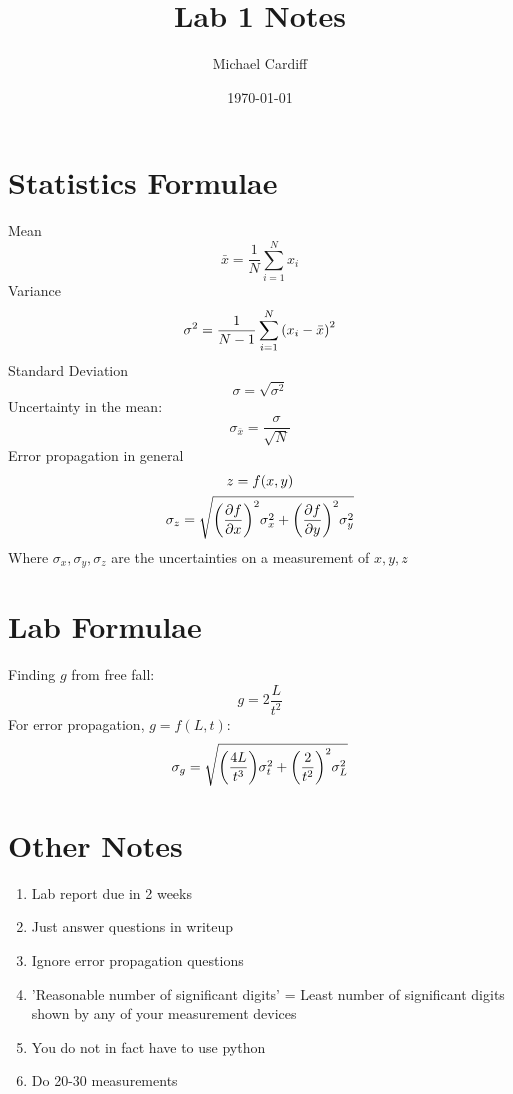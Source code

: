 \documentclass[12pt]{article}
\title{\vspace{-3em}Lab 1 Notes}
\author{Michael Cardiff}
\date{\today}
\begin{document}
\maketitle
\section{Statistics Formulae}
Mean
\begin{equation}
  \bar{x}=\frac{1}{N}\sum_{i=1}^Nx_i
\end{equation}
Variance
\begin{equation}
  \sigma^2=\frac{1}{N-1}\sum_{i=1}^N\qty(x_i-\bar{x})^2
\end{equation}
Standard Deviation
\begin{equation}
  \sigma=\sqrt{\sigma^2}
\end{equation}
Uncertainty in the mean:
\begin{equation}
  \sigma_{\bar{x}}=\frac{\sigma}{\sqrt{N}}
\end{equation}
Error propagation in general
\begin{gather*}
  z=f(x,y)\\
  \sigma_z=\sqrt{\qty(\pdv{f}{x})^2\sigma_x^2+\qty(\pdv{f}{y})^2\sigma_y^2}
\end{gather*}
Where $\sigma_x,\sigma_y,\sigma_z$ are the uncertainties on a measurement of $x,y,z$
\section{Lab Formulae}
Finding $g$ from free fall:
\begin{equation}
  g=2\frac{L}{t^2}
\end{equation}
For error propagation, $g=f(L,t)$:
\begin{equation}
  \sigma_g=\sqrt{\qty(\frac{4L}{t^3})\sigma_t^2+\qty(\frac{2}{t^2})^2\sigma_L^2}
\end{equation}

\section{Other Notes}
\begin{enumerate}
\item Lab report due in 2 weeks
\item Just answer questions in writeup
\item Ignore error propagation questions
\item 'Reasonable number of significant digits' = Least number of significant digits shown by any of your measurement devices
\item You do not in fact have to use python
\item Do 20-30 measurements
\end{enumerate}
\end{document}
